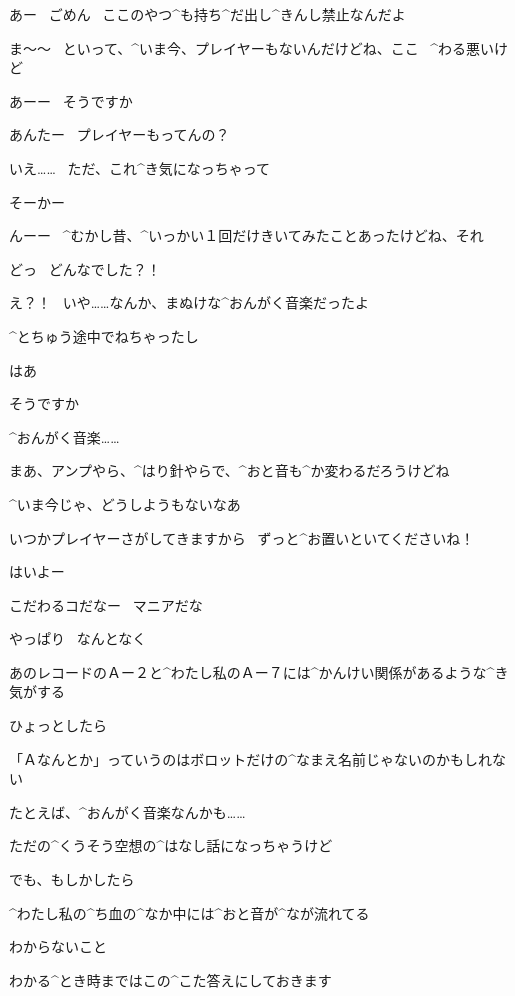 \Person あー
\ ごめん
\ ここのやつ^{も}{持}ち^{だ}{出}し^{きんし}{禁止}なんだよ

\page[57]
\Person ま〜〜
\ といって、^{いま}{今}、プレイヤーもないんだけどね、ここ
\ ^{わる}{悪}いけど

\Kokone あーー
\ そうですか

\Person あんたー
\ プレイヤーもってんの？

\Kokone いえ……
\ ただ、これ^{き}{気}になっちゃって

\page[58]
\Person そーかー

\Person んーー
\ ^{むかし}{昔}、^{いっかい}{１回}だけきいてみたことあったけどね、それ

\Kokone どっ
\ どんなでした？！

\Person え？！
\ いや……なんか、まぬけな^{おんがく}{音楽}だったよ

\Person ^{とちゅう}{途中}でねちゃったし

\Kokone はあ

\Kokone そうですか

\Kokone ^{おんがく}{音楽}……

\page[59]
\Person まあ、アンプやら、^{はり}{針}やらで、^{おと}{音}も^{か}{変}わるだろうけどね

\Person ^{いま}{今}じゃ、どうしようもないなあ

\Kokone いつかプレイヤーさがしてきますから
\ ずっと^{お}{置}いといてくださいね！

\Person はいよー

\Person こだわるコだなー
\ マニアだな

\page[60]
\Kokone やっぱり
\ なんとなく

\Kokone あのレコードのＡー２と^{わたし}{私}のＡー７には^{かんけい}{関係}があるような^{き}{気}がする

\page[61]
\Kokone ひょっとしたら

\Kokone 「Ａなんとか」っていうのはボロットだけの^{なまえ}{名前}じゃないのかもしれない

\Kokone たとえば、^{おんがく}{音楽}なんかも……

\page[62]
\Kokone ただの^{くうそう}{空想}の^{はなし}{話}になっちゃうけど

\Kokone でも、もしかしたら

\Kokone ^{わたし}{私}の^{ち}{血}の^{なか}{中}には^{おと}{音}が^{なが}{流}れてる

\page[64]
\Kokone わからないこと

\Kokone わかる^{とき}{時}まではこの^{こた}{答}えにしておきます


